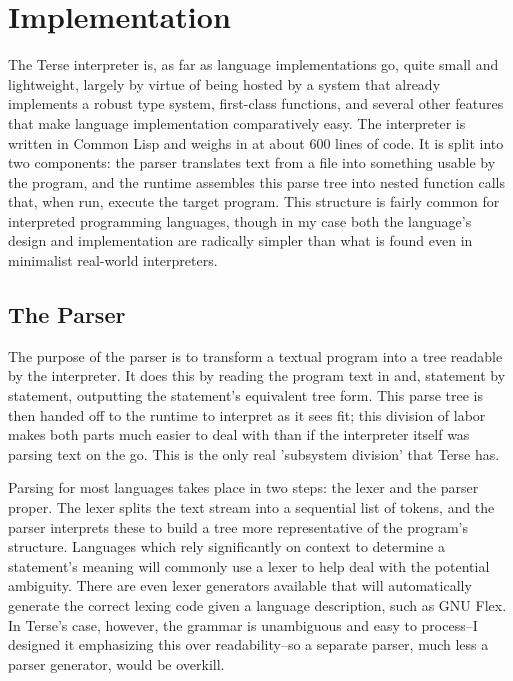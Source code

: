 \documentclass[12pt]{article}
\begin{document}
\section{Implementation}

The Terse interpreter is, as far as language implementations go, quite
small and lightweight, largely by virtue of being hosted by a system
that already implements a robust type system, first-class functions,
and several other features that make language implementation
comparatively easy. The interpreter is written in Common Lisp and
weighs in at about 600 lines of code. It is split into two components:
the parser translates text from a file into something usable by the
program, and the runtime assembles this parse tree into nested
function calls that, when run, execute the target program. This
structure is fairly common for interpreted programming languages,
though in my case both the language's design and implementation are
radically simpler than what is found even in minimalist real-world
interpreters.

\subsection{The Parser}

The purpose of the parser is to transform a textual program into a
tree readable by the interpreter. It does this by reading the program
text in and, statement by statement, outputting the statement's
equivalent tree form. This parse tree is then handed off to the
runtime to interpret as it sees fit; this division of labor makes both
parts much easier to deal with than if the interpreter itself was
parsing text on the go. This is the only real 'subsystem division'
that Terse has.

Parsing for most languages takes place in two steps: the lexer and the
parser proper. The lexer splits the text stream into a sequential list
of tokens, and the parser interprets these to build a tree more
representative of the program's structure. Languages which rely
significantly on context to determine a statement's meaning will
commonly use a lexer to help deal with the potential ambiguity. There
are even lexer generators available that will automatically generate
the correct lexing code given a language description, such as GNU
Flex. In Terse's case, however, the grammar is unambiguous and easy to
process--I designed it emphasizing this over readability--so a
separate parser, much less a parser generator, would be overkill.
\end{document}
